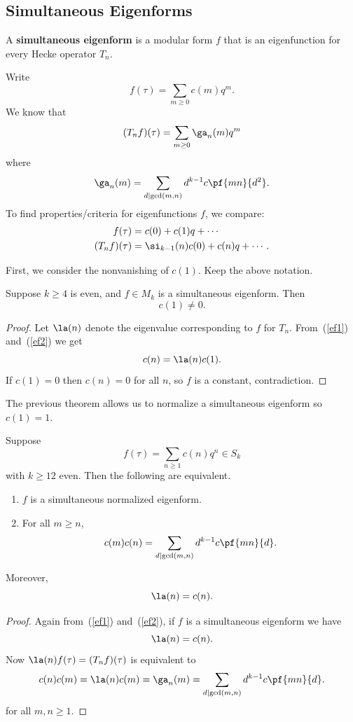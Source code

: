 \subsection{Simultaneous Eigenforms}
\begin{df}
A \textbf{simultaneous eigenform} is a modular form $f$ that is an eigenfunction for every Hecke operator $T_n$. 
\end{df}
Write
\[
f(\tau)=\sum_{m\ge 0} c(m)q^m.
\]
We know that
\[
(T_nf)(\tau)=\sum_{m\ge 0} \ga_n(m)q^m
\]
where
\[
\ga_n(m)=\sum_{d\mid \gcd(m,n)} d^{k-1} c\pf{mn}{d^2}.
\]
To find properties/criteria for eigenfunctions $f$, we compare:
\begin{align}
f(\tau)&=c(0)+c(1)q+\cdots\label{ef1}\\
(T_nf)(\tau)&=\si_{k-1}(n)c(0)+c(n)q+\cdots.\label{ef2}
\end{align}

First, we consider the nonvanishing of $c(1)$. Keep the above notation.
\begin{thm}[Apostol, 6.14]
Suppose $k\ge 4$ is even, and $f\in M_k$ is a simultaneous eigenform. Then
\[
c(1)\neq 0.
\]
\end{thm}
\begin{proof}
Let $\la(n)$ denote the eigenvalue corresponding to $f$ for $T_n$. 
From~(\ref{ef1}) and~(\ref{ef2}) we get
\[
c(n)=\la(n)c(1).
\]
If $c(1)=0$ then $c(n)=0$ for all $n$, so $f$ is a constant, contradiction.
\end{proof}

The previous theorem allows us to normalize a simultaneous eigenform so $c(1)=1$.
\begin{thm}\label{multthm}
Suppose 
\[f(\tau)=\sum_{n\ge 1} c(n)q^n\in S_k\]
with $k\ge 12$ even. Then the following are equivalent.
\begin{enumerate}
\item
$f$ is a simultaneous normalized eigenform.
\item For all $m\ge n$,
\[
c(m)c(n)=\sum_{d\mid \gcd(m,n)} d^{k-1} c\pf{mn}{d}.
\]
\end{enumerate}
Moreover, \[\la(n)=c(n).\]
\end{thm}
\begin{proof}
Again from~(\ref{ef1}) and~(\ref{ef2}), if $f$ is a simultaneous eigenform we have
\[
\la(n)=c(n).
\]
Now $\la(n)f(\tau)=(T_nf)(\tau)$  is equivalent to
\[
c(n)c(m)=\la(n)c(m)=\ga_n(m)=\sum_{d\mid\gcd(m,n)} d^{k-1} c\pf{mn}{d}.
\]
for all $m,n\ge 1$.
\end{proof}
